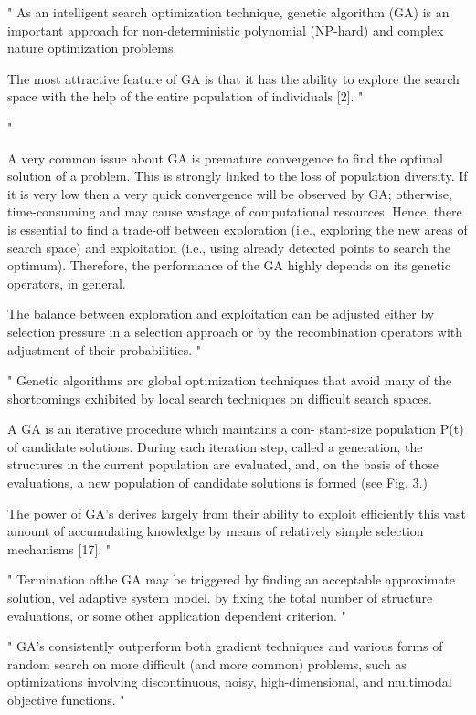 "
As an intelligent search optimization technique, genetic algorithm (GA) is an important approach for non-deterministic polynomial (NP-hard) and complex nature optimization problems.

The most attractive feature of GA is that it has the ability to explore the search space with the help of the entire population of individuals [2].
"\cite{hussain_trade-off_2020}

"

A very common issue about GA is premature convergence to find the optimal solution of a problem. This is strongly linked to the loss of population diversity. If it is very low then a very quick convergence will be observed by GA; otherwise, time-consuming and may cause wastage of computational resources. Hence, there is essential to find a trade-off between exploration (i.e., exploring the new areas of search space) and exploitation (i.e., using already detected points to search the optimum). Therefore, the performance of the GA highly depends on its genetic operators, in general.

 The balance between exploration and exploitation can be adjusted either by selection pressure in a selection approach or by the recombination operators with adjustment of their probabilities.
"\cite{hussain_trade-off_2020}



"
Genetic algorithms are global optimization techniques that avoid many of the shortcomings exhibited by local search techniques on difficult search spaces.

A GA is an iterative procedure which maintains a con- stant-size population P(t) of candidate solutions. During each iteration step, called a generation, the structures in the current population are evaluated, and, on the basis of those evaluations, a new population of candidate solutions is formed (see Fig. 3.)


The power of GA's derives largely from their ability to exploit efficiently this vast amount of accumulating knowledge by means of relatively simple selection mechanisms [17].
"\cite{grefenstette_optimization_1986}

"
Termination ofthe GA may be triggered by finding an acceptable approximate solution, vel adaptive system model. by fixing the total number of structure evaluations, or some other application dependent criterion.
"\cite{grefenstette_optimization_1986}


"
GA's consistently outperform both gradient techniques and various forms of random search on more difficult (and more common) problems, such as optimizations involving discontinuous, noisy, high-dimensional, and multimodal objective functions.
"\cite{grefenstette_optimization_1986}


